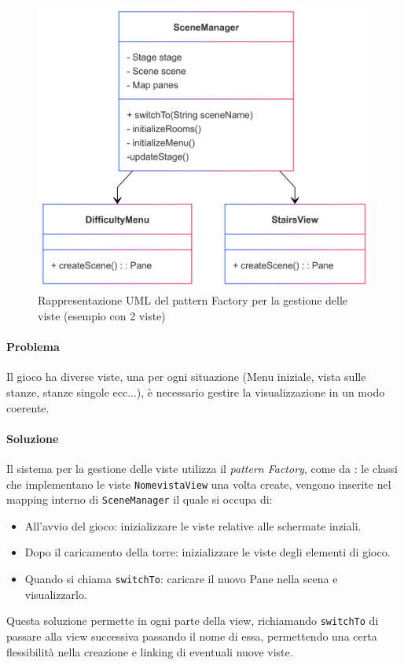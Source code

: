 \documentclass[a4paper,12pt]{report}
\begin{document}
\begin{figure}[H]
\centering{}
\includegraphics[width=\textwidth]{img/scenemanager.png}
\caption{Rappresentazione UML del pattern Factory per la gestione delle viste (esempio con 2 viste)}
\label{img:factory}
\end{figure}

\paragraph{Problema} Il gioco ha diverse viste, una per ogni situazione (Menu iniziale, vista sulle stanze, stanze singole ecc...),
%
è necessario gestire la visualizzazione in un modo coerente.

\paragraph{Soluzione} Il sistema per la gestione delle viste utilizza il \textit{pattern Factory}, come da
: le classi che implementano le viste \texttt{NomevistaView} una volta create, vengono inserite nel mapping
%
interno di \texttt{SceneManager} il quale si occupa di: 
\begin{itemize}
	\item All'avvio del gioco: inizializzare le viste relative alle schermate inziali.
	\item Dopo il caricamento della torre: inizializzare le viste degli elementi di gioco.
	\item Quando si chiama \texttt{switchTo}: caricare il nuovo Pane nella scena e visualizzarlo.
\end{itemize}
Questa soluzione permette in ogni parte della view, richiamando \texttt{switchTo} di passare alla view successiva passando il nome di essa,
%
permettendo una certa flessibilità nella creazione e linking di eventuali nuove viste.
\end{document}
